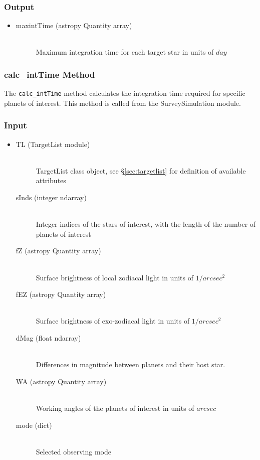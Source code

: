 \documentclass[cleanfoot]{asme2ej}
\begin{document}
\subsubsection*{Output}
\begin{itemize}
\item
\begin{description}
    \item[maxintTime (astropy Quantity array)] \hfill \\ Maximum integration time for each target star in units of $ day $
\end{description}
\end{itemize}

\subsubsection{calc\_intTime Method} \label{sec:calcintTimetask}
The \verb+calc_intTime+ method calculates the integration time required for specific planets of interest.  This method is called from the SurveySimulation module.

\subsubsection*{Input}
\begin{itemize}
\item 
\begin{description}
    \item[TL (TargetList module)] \hfill \\ TargetList class object, see \S\ref{sec:targetlist} for definition of available attributes
    \item[sInds (integer ndarray)] \hfill \\ Integer indices of the stars of interest, with the length of the number of planets of interest
    \item[fZ (astropy Quantity array)] \hfill \\ Surface brightness of local zodiacal light in units of $ 1/arcsec^2 $
    \item[fEZ (astropy Quantity array)] \hfill \\ Surface brightness of exo-zodiacal light in units of $ 1/arcsec^2 $
    \item[dMag (float ndarray)] \hfill \\ Differences in magnitude between planets and their host star.
    \item[WA (astropy Quantity array)] \hfill \\ Working angles of the planets of interest in units of $ arcsec $
    \item[mode (dict)] \hfill \\ Selected observing mode
\end{description}
\end{itemize}
\end{document}
